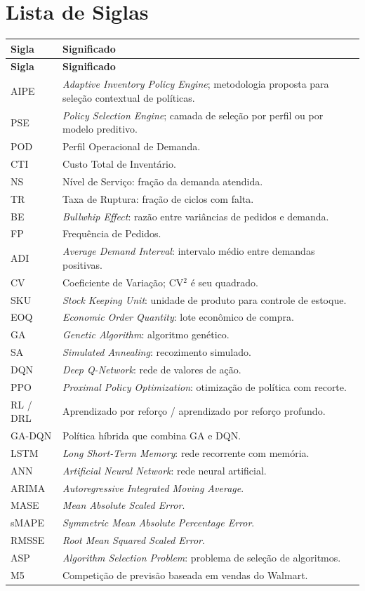 \chapter*{Lista de Siglas}
\begin{longtable}{@{}p{3cm}p{11.5cm}@{}}
\toprule
\textbf{Sigla} & \textbf{Significado}\\
\midrule\endfirsthead
\toprule\textbf{Sigla} & \textbf{Significado}\\\midrule\endhead
AIPE & \textit{Adaptive Inventory Policy Engine}; metodologia proposta para seleção contextual de políticas.\\
PSE & \textit{Policy Selection Engine}; camada de seleção por perfil ou por modelo preditivo.\\
POD & Perfil Operacional de Demanda.\\
CTI & Custo Total de Inventário.\\
NS & Nível de Serviço: fração da demanda atendida.\\
TR & Taxa de Ruptura: fração de ciclos com falta.\\
BE & \textit{Bullwhip Effect}: razão entre variâncias de pedidos e demanda.\\
FP & Frequência de Pedidos.\\
ADI & \textit{Average Demand Interval}: intervalo médio entre demandas positivas.\\
CV & Coeficiente de Variação; CV$^2$ é seu quadrado.\\
SKU & \textit{Stock Keeping Unit}: unidade de produto para controle de estoque.\\
EOQ & \textit{Economic Order Quantity}: lote econômico de compra.\\
GA & \textit{Genetic Algorithm}: algoritmo genético.\\
SA & \textit{Simulated Annealing}: recozimento simulado.\\
DQN & \textit{Deep Q-Network}: rede de valores de ação.\\
PPO & \textit{Proximal Policy Optimization}: otimização de política com recorte.\\
RL / DRL & Aprendizado por reforço / aprendizado por reforço profundo.\\
GA-DQN & Política híbrida que combina GA e DQN.\\
LSTM & \textit{Long Short-Term Memory}: rede recorrente com memória.\\
ANN & \textit{Artificial Neural Network}: rede neural artificial.\\
ARIMA & \textit{Autoregressive Integrated Moving Average}.\\
MASE & \textit{Mean Absolute Scaled Error}.\\
sMAPE & \textit{Symmetric Mean Absolute Percentage Error}.\\
RMSSE & \textit{Root Mean Squared Scaled Error}.\\
ASP & \textit{Algorithm Selection Problem}: problema de seleção de algoritmos.\\
M5 & Competição de previsão baseada em vendas do Walmart.\\
\bottomrule
\end{longtable}
\newpage\lhead{\rightmark}
